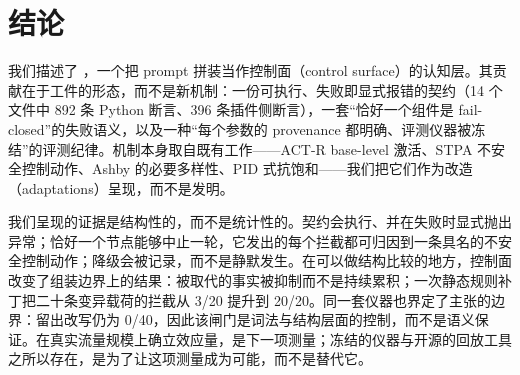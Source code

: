 \section{结论}

我们描述了 \system{}，一个把 prompt 拼装当作控制面（control surface）的认知层。其贡献在于工件的形态，而不是新机制：一份可执行、失败即显式报错的契约（14 个文件中 892 条 Python 断言、396 条插件侧断言），一套“恰好一个组件是 fail-closed”的失败语义，以及一种“每个参数的 provenance 都明确、评测仪器被冻结”的评测纪律。机制本身取自既有工作——ACT-R base-level 激活、STPA 不安全控制动作、Ashby 的必要多样性、PID 式抗饱和——我们把它们作为改造（adaptations）呈现，而不是发明。

我们呈现的证据是结构性的，而不是统计性的。契约会执行、并在失败时显式抛出异常；恰好一个节点能够中止一轮，它发出的每个拦截都可归因到一条具名的不安全控制动作；降级会被记录，而不是静默发生。在可以做结构比较的地方，控制面改变了组装边界上的结果：被取代的事实被抑制而不是持续累积；一次静态规则补丁把二十条变异载荷的拦截从 3/20 提升到 20/20。同一套仪器也界定了主张的边界：留出改写仍为 0/40，因此该闸门是词法与结构层面的控制，而不是语义保证。在真实流量规模上确立效应量，是下一项测量；冻结的仪器与开源的回放工具之所以存在，是为了让这项测量成为可能，而不是替代它。
